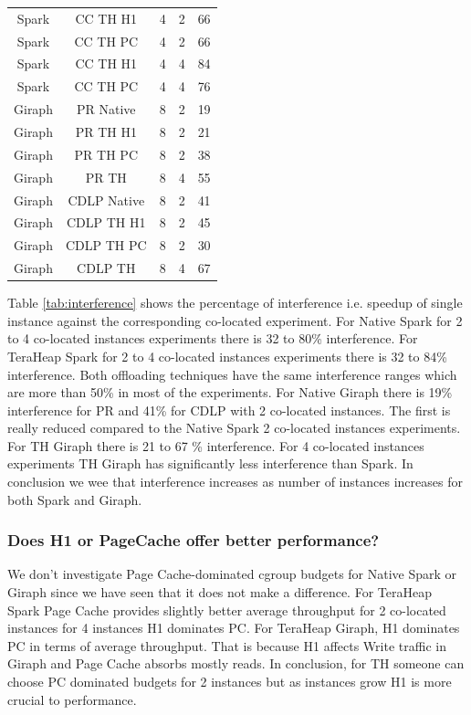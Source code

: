 \begin{table}[thbp]
\begin{tabular}{|c|c|c|c|c|}
          Spark & CC TH H1 & 4 & 2 & 66 \\
          Spark & CC TH PC & 4 & 2 & 66 \\
          Spark & CC TH H1 & 4 & 4 & 84  \\
          Spark & CC TH PC & 4 & 4 & 76 \\
          Giraph & PR Native & 8 & 2 & 19 \\
          Giraph & PR TH H1 & 8 & 2 & 21 \\
          Giraph & PR TH PC & 8 & 2 & 38 \\
          Giraph & PR TH & 8 & 4 & 55 \\
          Giraph & CDLP Native & 8 & 2 & 41 \\
          Giraph & CDLP TH H1 & 8 & 2 & 45 \\
          Giraph & CDLP TH PC & 8 & 2 & 30 \\
          Giraph & CDLP TH & 8 & 4 & 67 \\
    \hline
  \end{tabular}
\end{table}


Table \ref{tab:interference} shows the percentage of interference i.e. speedup of single instance against the corresponding co-located experiment. For Native Spark for 2 to 4 co-located instances experiments there is 32 to 80\% interference. For TeraHeap Spark for 2 to 4 co-located instances experiments there is 32 to 84\% interference. Both offloading techniques have the same interference ranges which are more than 50\% in most of the experiments. For Native Giraph there is 19\% interference for PR and 41\% for CDLP with 2 co-located instances. The first is really reduced compared to the Native Spark 2 co-located instances experiments. For TH Giraph there is 21 to 67 \% interference. For 4 co-located instances experiments TH Giraph has significantly less interference than Spark. In conclusion we wee that interference increases as number of instances increases for both Spark and Giraph.

\subsubsection{Does H1 or PageCache offer better performance?}
We don't investigate Page Cache-dominated cgroup budgets for Native Spark or Giraph since we have seen that it does not make a difference. For TeraHeap Spark Page Cache provides slightly better average throughput for 2 co-located instances for 4 instances H1 dominates PC. For TeraHeap Giraph, H1 dominates PC in terms of average throughput. That is because H1 affects Write traffic in Giraph and Page Cache absorbs mostly reads. In conclusion, for TH someone can choose PC dominated budgets for 2 instances but as instances grow H1 is more crucial to performance.

